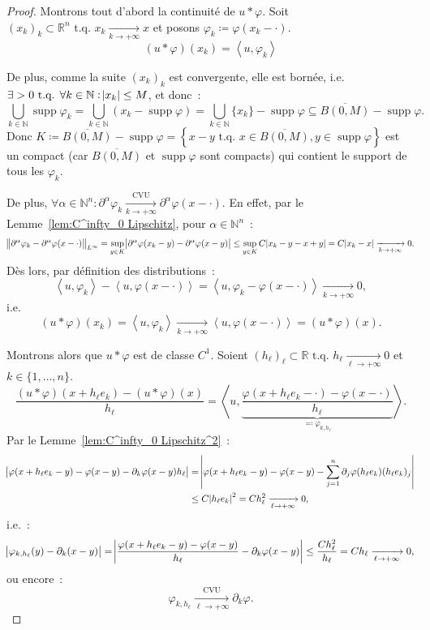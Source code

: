 \documentclass{report}
\DeclareMathOperator{\supp}{supp}
\newcommand{\R}{{\mathbb R}}
\newcommand{\N}{{\mathbb N}}
\newcommand{\scpr}[2]{\left\langle#1, #2\right\rangle}
\newcommand{\tq}{\text{ t.q. }}
\newcommand{\st}{\tq}
\newcommand{\pinfty}{{+\infty}}
\theoremstyle{definition}
\theoremstyle{remark}
\begin{document}
\begin{proof} Montrons tout d'abord la continuité de $u * \varphi$. Soit $(x_k)_k \subset \R^n \st x_k \xrightarrow[k \to \pinfty]{} x$ et posons
$\varphi_k \coloneqq \varphi(x_k-\cdot)$.
\[(u * \varphi)(x_k) = \scpr u{\varphi_k}\]

De plus, comme la suite $(x_k)_k$ est convergente, elle est bornée, i.e. $\exists > 0 \st \forall k \in \N : \abs {x_k} \leq M$, et donc~:
\[\bigcup_{k \in \N}\supp\varphi_k = \bigcup_{k \in \N}\left(x_k-\supp\varphi\right) = \bigcup_{k \in \N}\{x_k\} - \supp\varphi \subseteq \overline {B(0, M)} - \supp\varphi.\]
Donc $K \coloneqq \overline {B(0, M)} - \supp\varphi = \left\{x-y \st x \in \overline {B(0, M)}, y \in \supp\varphi\right\}$ est un compact (car $\overline {B(0, M)}$
et $\supp\varphi$ sont compacts) qui contient le support de tous les $\varphi_k$.

De plus, $\forall \alpha \in \N^n : \partial^\alpha\varphi_k \xrightarrow[k \to \pinfty]{\text{CVU}} \partial^\alpha\varphi(x-\cdot)$. En effet, par le
Lemme~\ref{lem:C^infty_0 Lipschitz}, pour $\alpha \in \N^n$~:
\[\norm {\partial^\alpha\varphi_k - \partial^\alpha\varphi(x-\cdot)}_{L^\infty} = \sup_{y \in K}\abs {\partial^\alpha\varphi(x_k-y) - \partial^\alpha\varphi(x-y)}
	\leq \sup_{y \in K}C\abs {x_k-y-x+y} = C\abs {x_k-x} \xrightarrow[k \to \pinfty]{} 0.\]
Dès lors, par définition des distributions~:
\[\scpr u{\varphi_k} - \scpr u{\varphi(x-\cdot)} = \scpr u{\varphi_k-\varphi(x-\cdot)} \xrightarrow[k \to \pinfty]{} 0,\]
i.e.
\[(u*\varphi)(x_k) = \scpr u{\varphi_k} \xrightarrow[k \to \pinfty]{} \scpr u{\varphi(x-\cdot)} = (u*\varphi)(x).\]

Montrons alors que $u * \varphi$ est de classe $C^1$. Soient $(h_\ell)_\ell \subset \R \st h_\ell \xrightarrow[\ell \to \pinfty]{} 0$ et $k \in \{1, \ldots, n\}$.
\[\frac {(u*\varphi)(x+h_\ell e_k) - (u*\varphi)(x)}{h_\ell} = \scpr u{\underbrace {\frac {\varphi(x+h_\ell e_k - \cdot) - \varphi(x-\cdot)}{h_\ell}}_{\eqqcolon \varphi_{k,h_\ell}}}.\]
Par le Lemme~\ref{lem:C^infty_0 Lipschitz^2}~:
\begin{align*}
	\abs {\varphi(x+h_\ell e_k - y) - \varphi(x-y) - \partial_k\varphi(x-y)h_\ell}
			&= \abs {\varphi(x+h_\ell e_k - y) - \varphi(x-y) - \sum_{j=1}^n\partial_j\varphi(h_\ell e_k)(h_\ell e_k)_j} \\
	&\leq C\abs {h_\ell e_k}^2 = Ch_\ell^2 \xrightarrow[\ell \to \pinfty]{} 0,
\end{align*}
i.e.~:
\begin{equation}\label{eq:borne varphi_k,h ell - partial_k varphi}
	\abs {\varphi_{k,h_\ell}(y) - \partial_k(x-y)} = \abs {\frac {\varphi(x+h_\ell e_k - y) - \varphi(x-y)}{h_\ell} - \partial_k\varphi(x-y)}
	\leq \frac {Ch_\ell^2}{h_\ell} = Ch_\ell \xrightarrow[\ell \to \pinfty]{} 0,
\end{equation}
ou encore~:
\[\varphi_{k,h_\ell} \xrightarrow[\ell \to \pinfty]{\text{CVU}} \partial_k\varphi.\]


\end{proof}
\end{document}
